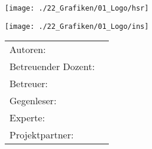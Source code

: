 
\begin{titlepage}
\begin{center}
\begin{minipage}[t]{0.45\textwidth}
    \texttt{[image: ./22\_Grafiken/01\_Logo/hsr]}
\end{minipage}
\hspace{\fill} %
\begin{minipage}[t]{0.45\textwidth}
    \vspace{-2.5cm}
    \texttt{[image: ./22\_Grafiken/01\_Logo/ins]} %
\end{minipage}

\end{center}

\vspace{15ex} %
\begin{center}
	\Huge 
	\begin{framed}
		\textbf{\titel}
	\end{framed}
	
	\vspace{3ex}
	\textbf{\arbeit}
	
	\vspace{1ex}
	\LARGE 
	\place
	
	\vspace{5ex}
	\begin{framed}
		\timeperiod
	\end{framed}
\end{center}

\vspace{11ex}
\begin{tabular}{ll} %
	Autoren:         		& \authors	\\
	Betreuender Dozent:		& \advisorprof  	\\
	Betreuer:        		& \advisor    	\\
	Gegenleser:      		& \contraprof  	\\
	Experte:      			& \expert  		\\
	Projektpartner:      	& \ins  		\\
\end{tabular}

\end{titlepage}

\restoregeometry %
